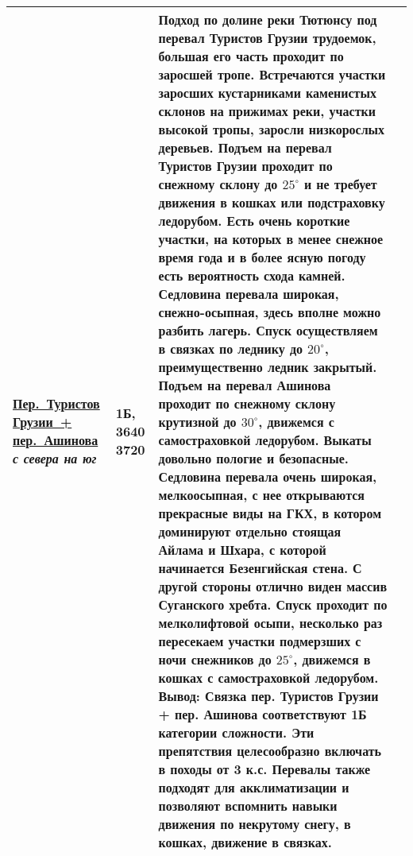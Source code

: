 \begin{longtable}{|>{\centering\arraybackslash}m{4.5cm}|>{\centering\arraybackslash}m{1.8cm}|>{\raggedright\arraybackslash}m{9.6cm}|>{\centering\arraybackslash}m{1.2cm}|}
		 	\hyperref[subsec:Day4]{{\small Пер.~Туристов Грузии~+ пер.~Ашинова}}											\newline\textit{с севера на юг}			&	1Б, 3640 3720				&	{\small Подход по долине реки Тютюнсу под перевал Туристов Грузии трудоемок, большая его часть проходит по заросшей тропе. Встречаются участки заросших кустарниками каменистых склонов на прижимах реки, участки высокой тропы, заросли низкорослых деревьев. Подъем на перевал Туристов Грузии проходит по снежному склону до $25^\circ$ и не требует движения в кошках или подстраховку ледорубом. Есть очень короткие участки, на которых в менее снежное время года и в более ясную погоду есть вероятность схода камней. Седловина перевала широкая, снежно-осыпная, здесь вполне можно разбить лагерь. Спуск осуществляем в связках по леднику до $20^\circ$, преимущественно ледник закрытый. Подъем на перевал Ашинова проходит по снежному склону крутизной до $30^\circ$, движемся с самостраховкой ледорубом. Выкаты довольно пологие и безопасные. Седловина перевала очень широкая, мелкоосыпная, с нее открываются прекрасные виды на ГКХ, в котором доминируют отдельно стоящая Айлама и Шхара, с которой начинается Безенгийская стена. С другой стороны отлично виден массив Суганского хребта. Спуск проходит по мелколифтовой осыпи, несколько раз пересекаем участки подмерзших с ночи снежников до $25^\circ$, движемся в кошках с самостраховкой ледорубом. \newline	\textbf{Вывод:} Связка пер. Туристов Грузии + пер. Ашинова соответствуют 1Б категории сложности. Эти препятствия целесообразно включать в походы от 3 к.с. Перевалы также подходят для акклиматизации и позволяют вспомнить навыки движения по некрутому снегу, в кошках, движение в связках.}																												&			\\ \hline

\end{longtable}
